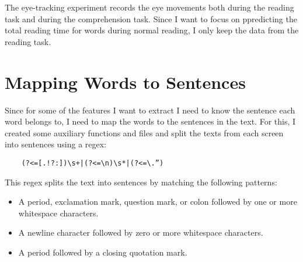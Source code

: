 The eye-tracking experiment records the eye movements both during the reading task and during the comprehension task. Since I want to focus on ppredicting the total reading time for words during normal reading, I only keep the data from the reading task.

\section{Mapping Words to Sentences}
Since for some of the features I want to extract I need to know the sentence each word belongs to, I need to map the words to the sentences in the text. For this, I created some auxiliary functions and files and split the texts from each screen into sentences using a regex: 
\begin{verbatim}
    (?<=[.!?:])\s+|(?<=\n)\s*|(?<=\.”)
\end{verbatim}
This regex splits the text into sentences by matching the following patterns:
\begin{itemize}
    \item A period, exclamation mark, question mark, or colon followed by one or more whitespace characters.
    \item A newline character followed by zero or more whitespace characters.
    \item A period followed by a closing quotation mark.
\end{itemize}